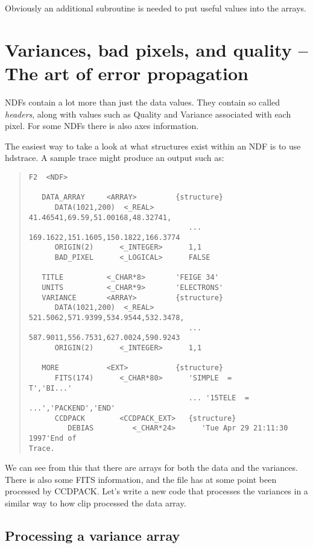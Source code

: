     
Obviously an additional subroutine is needed to put useful values into 
the arrays.

\section{Variances, bad pixels, and quality -- The art of error propagation}

NDFs contain a lot more than just the data values. They contain so called
{\em headers}, along with values such as Quality and Variance associated with
each pixel. For some NDFs there is also axes information. 
 
The easiest way to take a look at what structures exist within an
NDF is to use {\sf hdstrace}. 
A sample trace might produce an output such as:

\begin{quote}
{\small
\begin{verbatim}
F2  <NDF>
 
   DATA_ARRAY     <ARRAY>         {structure}
      DATA(1021,200)  <_REAL>        41.46541,69.59,51.00168,48.32741,
                                     ... 169.1622,151.1605,150.1822,166.3774
      ORIGIN(2)      <_INTEGER>      1,1
      BAD_PIXEL      <_LOGICAL>      FALSE
 
   TITLE          <_CHAR*8>       'FEIGE 34'
   UNITS          <_CHAR*9>       'ELECTRONS'
   VARIANCE       <ARRAY>         {structure}
      DATA(1021,200)  <_REAL>        521.5062,571.9399,534.9544,532.3478,
                                     ... 587.9011,556.7531,627.0024,590.9243
      ORIGIN(2)      <_INTEGER>      1,1
 
   MORE           <EXT>           {structure}
      FITS(174)      <_CHAR*80>      'SIMPLE  =                    T','BI...'
                                     ... '15TELE  =       
...','PACKEND','END'
      CCDPACK        <CCDPACK_EXT>   {structure}
         DEBIAS         <_CHAR*24>      'Tue Apr 29 21:11:30 1997'End of 
Trace.
\end{verbatim}
}
\end{quote}

We can see from this that there are arrays for both the data and the
variances. There is also some FITS information, and the file has at some
point been processed by CCDPACK. Let's write a new code that processes the
variances in a similar way to how clip processed the data array. 

\subsection{Processing a variance array}
 
